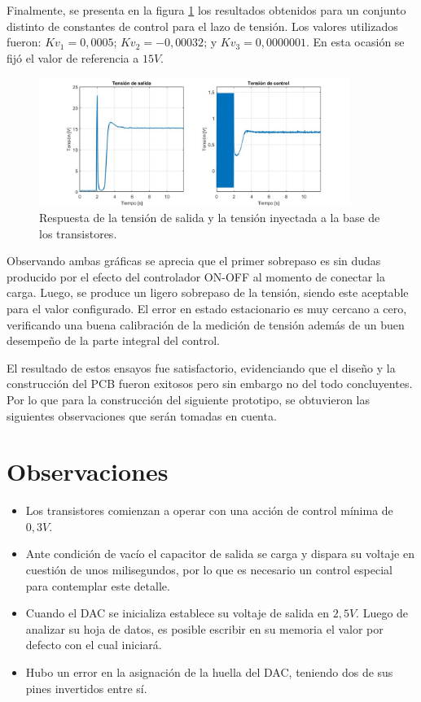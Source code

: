Finalmente, se presenta en la figura \ref{F:Resultados_3} los resultados obtenidos para un conjunto distinto de constantes de control para el lazo de tensión. Los valores utilizados fueron: $Kv_1=0,0005$; $Kv_2=-0,00032$; y $Kv_3=0,0000001$. En esta ocasión se fijó el valor de referencia a $15V$. 

\begin{figure}[htbp]
    \centering
    \includegraphics[width=0.9\textwidth]{./imagenes/NF10_tension_control.jpg}
    \caption{Respuesta de la tensión de salida y la tensión inyectada a la base de los transistores.}
    \label{F:Resultados_3}
\end{figure}\par 
Observando ambas gráficas se aprecia que el primer sobrepaso es sin dudas producido por el efecto del controlador ON-OFF al momento de conectar la carga. Luego, se produce un ligero sobrepaso de la tensión, siendo este aceptable para el valor configurado. El error en estado estacionario es muy cercano a cero, verificando una buena calibración de la medición de tensión además de un buen desempeño de la parte integral del control. \par 

El resultado de estos ensayos fue satisfactorio, evidenciando que el diseño y la construcción del PCB fueron exitosos pero sin embargo no del todo concluyentes. Por lo que para la construcción del siguiente prototipo, se obtuvieron las siguientes observaciones que serán tomadas en cuenta.  \par 


\section*{Observaciones}
\begin{itemize}
    \item Los transistores comienzan a operar con una acción de control mínima de $0,3V$.
    \item Ante condición de vacío el capacitor de salida se carga y dispara su voltaje en cuestión de unos milisegundos, por lo que es necesario un control especial para contemplar este detalle.
    \item Cuando el DAC se inicializa establece su voltaje de salida en $2,5V$. Luego de analizar su hoja de datos, es posible escribir en su memoria  el valor por defecto con el cual iniciará.
    \item Hubo un error en la asignación de la huella del DAC, teniendo dos de sus pines invertidos entre sí.
\end{itemize}

